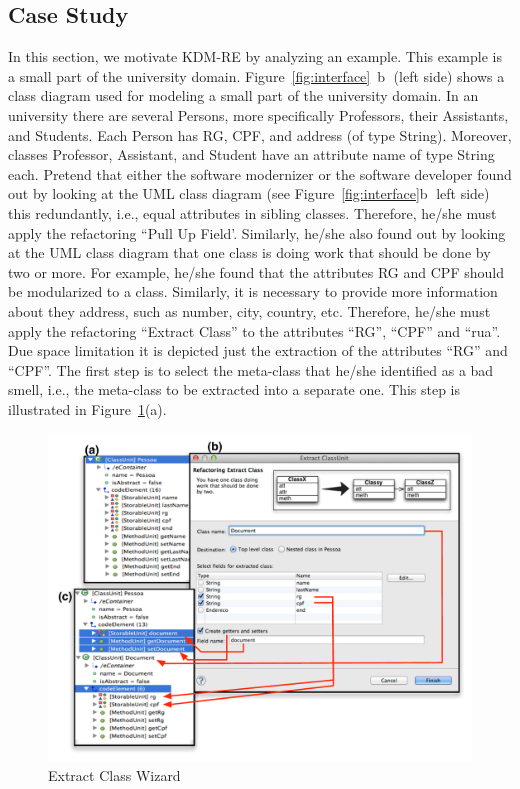 \documentclass[12pt]{article}
\begin{document}
\subsection{Case Study}

In this section, we motivate KDM-RE by analyzing an example. This example is a small part of the university domain.  Figure~\ref{fig:interface}~\textcircled{b} (left side) shows a class diagram used for modeling a small part of the
university domain. In an university there are several Persons, more specifically Professors, their Assistants, and Students. Each Person has RG, CPF, and address (of type String). Moreover, classes Professor, Assistant, and Student have an attribute name of type String each. Pretend that either the software modernizer or the software developer found out by looking at the UML class diagram (see Figure~\ref{fig:interface}\textcircled{b} left side) this redundantly, i.e., equal attributes in sibling classes. Therefore, he/she must apply the refactoring ``Pull Up Field'. Similarly, he/she also found out by looking at the UML class diagram that one class is doing work that should be done by two or more. For example, he/she found that the attributes RG and CPF should be modularized to a class. Similarly, it is necessary to provide more information about they address, such as number, city, country, etc. Therefore, he/she must apply the refactoring ``Extract Class'' to the attributes ``RG'', ``CPF'' and ``rua''. Due space limitation it is depicted just the extraction of the attributes ``RG'' and ``CPF''.  The first step is to select the meta-class that he/she identified as a bad smell, i.e., the meta-class to be extracted into a separate one.  This step is illustrated in Figure~\ref{fig:wizard}(a). 

\begin{figure}[!ht]
\centering
  \includegraphics[scale=0.6]{figure/Wizard2}
\caption{Extract Class Wizard}
\label{fig:wizard}
\end{figure}
\end{document}
